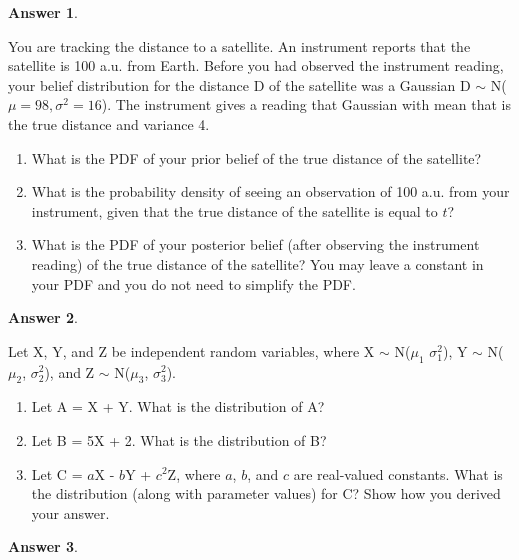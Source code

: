 \documentclass[12pt]{article}
\renewcommand{\(}{\left(}
\renewcommand{\)}{\right)}
\theoremstyle{definition}
\newtheorem*{answer}{Answer}
\begin{document}
\begin{enumerate}
{    \begin{shaded}
    \begin{answer}
    
    \end{answer}
    \end{shaded}
    \newpage
    \item You are tracking the distance to a satellite. An instrument reports that the satellite is 100 a.u. from Earth. Before you had observed the instrument reading, your belief distribution for the distance D of the satellite was a Gaussian D $\sim$ N($\mu = 98, \sigma^2 = 16$). The instrument gives a reading that Gaussian with mean that is the true distance and variance 4.
    \begin{enumerate}
        \item What is the PDF of your prior belief of the true distance of the satellite?
        \item What is the probability density of seeing an observation of 100 a.u. from your instrument, given that the true distance of the satellite is equal to $t$?
        \item What is the PDF of your posterior belief (after observing the instrument reading) of the true distance of the satellite? You may leave a constant in your PDF and you do not need to simplify the PDF.
    \end{enumerate}
    
    \begin{shaded}
    \begin{answer}
    
    \end{answer}
    \end{shaded}
    \newpage
    \item Let X, Y, and Z be independent random variables, where X $\sim$ N($\mu_1$ $\sigma_1^2$), Y $\sim$ N($\mu_2$, $\sigma_2^2$), and Z $\sim$ N($\mu_3$, $\sigma_3^2$).
    \begin{enumerate}
        \item Let A = X + Y. What is the distribution of A?
        \item Let B = 5X + 2. What is the distribution of B?
        \item Let C = $a$X - $b$Y + $c^2$Z, where $a$, $b$, and $c$ are real-valued constants. What is the distribution (along with parameter values) for C? Show how you derived your answer.
    \end{enumerate}
    
    \begin{shaded}
    \begin{answer}
    

\end{answer}
\end{shaded}}
\end{enumerate}
\end{document}
